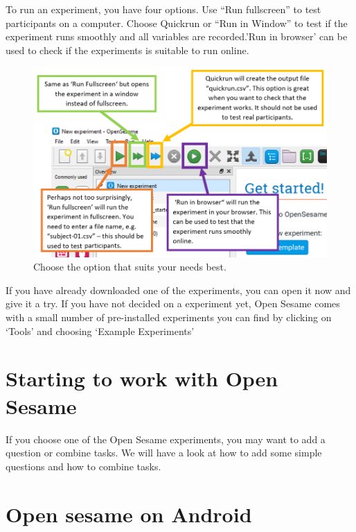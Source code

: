 \documentclass[
]{book}
\begin{document}
To run an experiment, you have four options. Use ``Run fullscreen'' to test participants on a computer. Choose Quickrun or ``Run in Window'' to test if the experiment runs smoothly and all variables are recorded.'Run in browser' can be used to check if the experiments is suitable to run online.

\begin{figure}

{\centering \includegraphics[width=0.85\linewidth]{images/opensesame/runexp} 

}

\caption{Choose the option that suits your needs best.}\label{fig:Figure12-4}
\end{figure}

If you have already downloaded one of the experiments, you can open it now and give it a try. If you have not decided on a experiment yet, Open Sesame comes with a small number of pre-installed experiments you can find by clicking on `Tools' and choosing `Example Experiments'

\hypertarget{starting-to-work-with-open-sesame}{%
\section{Starting to work with Open Sesame}\label{starting-to-work-with-open-sesame}}

If you choose one of the Open Sesame experiments, you may want to add a question or combine tasks. We will have a look at how to add some simple questions and how to combine tasks.

\hypertarget{open-sesame-on-android}{%
\section{Open sesame on Android}\label{open-sesame-on-android}}
\end{document}
